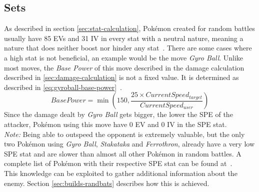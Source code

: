 \subsection{Sets}
\label{sec:randbats-sets}
As described in section \ref{sec:stat-calculation}, Pokémon created for random battles
usually have 85 \ac{EV}s and 31 \ac{IV} in every stat with a neutral nature, 
meaning a nature that does neither boost nor hinder any stat~\autocite{Smogon:RandBatsGuide}.
There are some cases where a high stat is not beneficial, an example would be the 
move \textit{Gyro Ball}. Unlike most moves, the \textit{Base Power} of this move
described in the damage calculation described in \ref{sec:damage-calculation} is not
a fixed value. It is determined as described in \ref{eq:gyroball-base-power}~\autocite{Bulbapedia:GyroBall}.
\begin{equation}
	\label{eq:gyroball-base-power}
	BasePower = \min\left( 150, \frac{25 \times CurrentSpeed_{target}}{CurrentSpeed_{user}}\right)
\end{equation} 
Since the damage dealt by \textit{Gyro Ball} gets bigger, the lower the \ac{SPE} of the
attacker, Pokémon using this move have 0 \ac{EV} and 0 \ac{IV} in the \ac{SPE} stat. \\
\textit{Note:} Being able to outspeed the opponent is extremely valuable, but the only
two Pokémon using \textit{Gyro Ball}, \textit{Stakataka} and \textit{Ferrothron}, already
have a very low \ac{SPE} stat and are slower than almost all other Pokémon in random
battles. A complete list of Pokémon with their respective \ac{SPE} stat can be found
at~\autocite{Bulbapedia:PokemonBySpeed}. \\
This knowledge can be exploited to gather additional information about the enemy. Section
\ref{sec:builds-randbats} describes how this is achieved.

